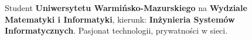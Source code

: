 \documentclass[9pt]{developercv} %
\begin{document}
\vspace{0.5cm}



\begin{minipage}[t]{0.4\textwidth} %
    \vspace{-\baselineskip} %

    Student \textbf{Uniwersytetu Warmińsko-Mazurskiego} na \textbf{Wydziale Matematyki i Informatyki}, kierunk: \textbf{Inżynieria Systemów Informatycznych}. Pasjonat technologii, prywatności w sieci.\\ %
\end{minipage}
\hfill %
\begin{minipage}[t]{0.5\textwidth} %
    \vspace{-\baselineskip} %
    \begin{barchart}{5.5}
    \end{barchart}
\end{minipage}

\begin{center}
\end{center}


\end{document}
